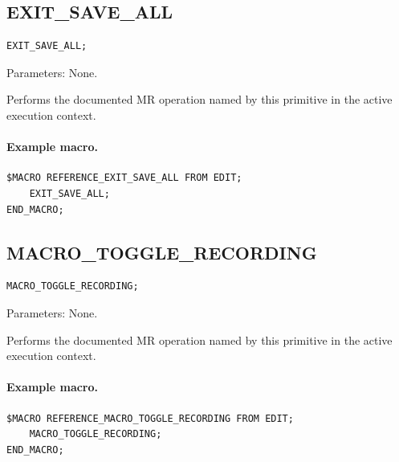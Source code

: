 \documentclass[a4paper,10pt,twoside,openany]{book}
\newenvironment{mrmacextension}{\begin{changebar}}{\end{changebar}}
\begin{document}
\begin{mrmacextension}
\label{prim:procedure-exit-save-all}
\subsection*{EXIT\_SAVE\_ALL}
\begin{verbatim}
EXIT_SAVE_ALL;
\end{verbatim}
Parameters: None.

Performs the documented MR operation named by this primitive in the active execution context.

\paragraph{Example macro.}
\begin{verbatim}
$MACRO REFERENCE_EXIT_SAVE_ALL FROM EDIT;
    EXIT_SAVE_ALL;
END_MACRO;
\end{verbatim}
\end{mrmacextension}

\begin{mrmacextension}
\label{prim:procedure-macro-toggle-recording}
\subsection*{MACRO\_TOGGLE\_RECORDING}
\begin{verbatim}
MACRO_TOGGLE_RECORDING;
\end{verbatim}
Parameters: None.

Performs the documented MR operation named by this primitive in the active execution context.

\paragraph{Example macro.}
\begin{verbatim}
$MACRO REFERENCE_MACRO_TOGGLE_RECORDING FROM EDIT;
    MACRO_TOGGLE_RECORDING;
END_MACRO;
\end{verbatim}
\end{mrmacextension}
\end{document}
